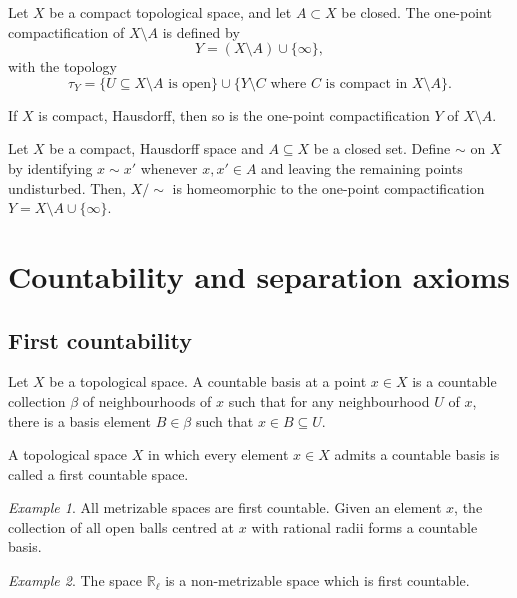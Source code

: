\documentclass[11pt]{article}
\newcommand{\R}{\mathbb{R}}
\theoremstyle{definition}
\theoremstyle{remark}
\newtheorem*{example}{Example}
\numberwithin{equation}{section}
\begin{document}
    \begin{definition}
        Let $X$ be a compact topological space, and let $A \subset X$ be closed. The
        one-point compactification of $X\setminus A$ is defined by \[
            Y = (X \setminus A) \cup\{\infty\},
        \] with the topology \[
            \tau_Y = \{U\subseteq X\setminus A\text{ is open}\} \cup \{Y\setminus
            C\text{ where } C\text{ is compact in }X\setminus A\}.
        \] 
    \end{definition}

    \begin{lemma}
        If $X$ is compact, Hausdorff, then so is the one-point compactification $Y$
        of $X\setminus A$.
    \end{lemma}

    \begin{lemma}
        Let $X$ be a compact, Hausdorff space and $A\subseteq X$ be a closed set.
        Define $\sim$ on $X$ by identifying $x \sim x'$ whenever $x, x' \in A$ and
        leaving the remaining points undisturbed. Then, $X/\!\sim$ is homeomorphic to
        the one-point compactification $Y = X\setminus A \cup \{\infty\}$.
    \end{lemma}
    

    \section{Countability and separation axioms}
    
    \subsection{First countability}
    
    \begin{definition}
        Let $X$ be a topological space. A countable basis at a point $x \in X$ is a
        countable collection $\beta$ of neighbourhoods of $x$ such that for any
        neighbourhood $U$ of $x$, there is a basis element $B \in \beta$ such that $x
        \in B \subseteq U$.
    \end{definition}

    \begin{definition}
        A topological space $X$ in which every element $x \in X$ admits a countable
        basis is called a first countable space.
    \end{definition}
    \begin{example}
        All metrizable spaces are first countable. Given an element $x$, the
        collection of all open balls centred at $x$ with rational radii forms a
        countable basis.
    \end{example}
    \begin{example}
        The space $\R_\ell$ is a non-metrizable space which is first countable.
    \end{example}
    
\end{document}
